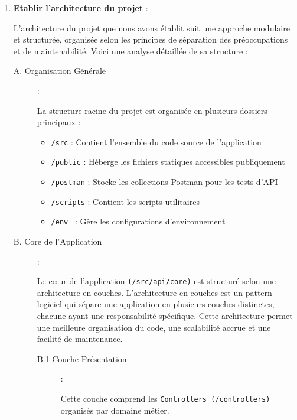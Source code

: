 {\begin{enumerate}
    \vspace{0.35cm}
    
    \item \textbf{Etablir l'architecture du projet} : 

    L'architecture du projet que nous avons établit suit une approche modulaire et structurée, organisée selon les principes de séparation des préoccupations et de maintenabilité. Voici une analyse détaillée de sa structure :

    \begin{description}
        \item[A. Organisation Générale] : 

            La structure racine du projet est organisée en plusieurs dossiers principaux : 

            \begin{itemize}
                \item \verb|/src| : Contient l'ensemble du code source de l'application
                \item \verb|/public| : Héberge les fichiers statiques accessibles publiquement
                \item \verb|/postman| : Stocke les collections Postman pour les tests d'API
                \item \verb|/scripts| : Contient les scripts utilitaires
                \item \verb|/env | : Gère les configurations d'environnement
            \end{itemize}
        
        \item[B. Core de l'Application] :

            Le cœur de l'application \verb|(/src/api/core)| est structuré selon une architecture en couches. L’architecture en couches est un pattern logiciel qui sépare une application en plusieurs couches distinctes, chacune ayant une responsabilité spécifique. Cette architecture permet une meilleure organisation du code, une scalabilité accrue et une facilité de maintenance.

            \begin{description}
                \item[B.1 Couche Présentation] :
                
                Cette couche comprend les \verb|Controllers (/controllers)| organisés par domaine métier.


\end{description}
\end{description}
\end{enumerate}}
